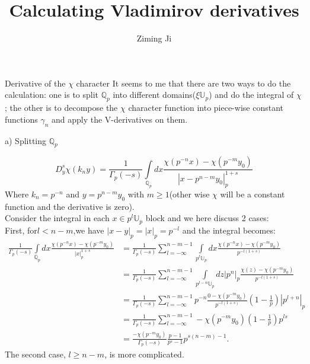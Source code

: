 \documentclass[12pt]{article}
\begin{document}
 
\title{Calculating Vladimirov derivatives}
\author{Ziming Ji}
 
\maketitle
 
\begin{section}{Derivative of the $\chi$ character}
It seems to me that there are two ways to do the calculation: one is to split $\mathbb{Q}_p$ into different domains($\xi \mathbb{U}_p$) and do the integral of $\chi$; the other is to decompose the $\chi$ character function into piece-wise constant functions $\gamma_n$ and apply the V-derivatives on them.

\begin{paragraph}{a) Splitting $\mathbb{Q}_p$}

\begin{equation}
D^s_y \chi(k_n y)=\frac{1}{\Gamma_p (-s)} \int\limits _{\mathbb{Q}_p}dx \frac{\chi( p^{-n} x) - \chi( p^{-m}y_0)}{|x-p^{n-m}y_0|_p^{1+s}}
\end{equation}
Where $k_n=p^{-n}$ and $y=p^{n-m} y_0$ with $m\geq 1$(other wise $\chi$ will be a constant function and the derivative is zero).\\
Consider the integral in each $x\in p^l \mathbb{U}_p$ block and we here discuss 2 cases:\\
First, for$l<n-m$,we have $|x-y|_p=|x|_p=p^{-l}$ and the integral becomes:
\begin{equation}
\begin{split}
\frac{1}{\Gamma_p(-s)}\int\limits _{\mathbb{Q}_p}dx \frac{\chi( p^{-n} x) - \chi( p^{-m}y_0)}{|x|_p^{1+s}}
&= \frac{1}{\Gamma_p(-s)}\sum_{l=-\infty}^{n-m-1} \int\limits _{p^l \mathbb{U}_p}dx \frac{\chi( p^{-n} x) - \chi( p^{-m}y_0)}{p^{-l(1+s)}} \\
&= \frac{1}{\Gamma_p(-s)}\sum_{l=-\infty}^{n-m-1} \int\limits _{p^{l-n} \mathbb{U}_p}dz |p^n|_p \frac{\chi(z) - \chi( p^{-m}y_0)}{p^{-l(1+s)}} \\
&= \frac{1}{\Gamma_p(-s)}\sum_{l=-\infty}^{n-m-1} p^{-n} \frac{0 - \chi( p^{-m}y_0)}{p^{-l(1+s)}} (1-\frac{1}{p}) |p^{l+n}|_p \\
&= \frac{1}{\Gamma_p(-s)}\sum_{l=-\infty}^{n-m-1} - \chi( p^{-m}y_0)(1-\frac{1}{p})p^{ls}\\
&= \frac{- \chi( p^{-m}y_0)}{\Gamma_p(-s)} \frac{p-1}{p^s-1} p^{s(n-m)-1}.
\end{split}
\end{equation}
The second case, $l\geq n-m$, is more complicated. 

\end{paragraph}

\end{section}
\end{document}
